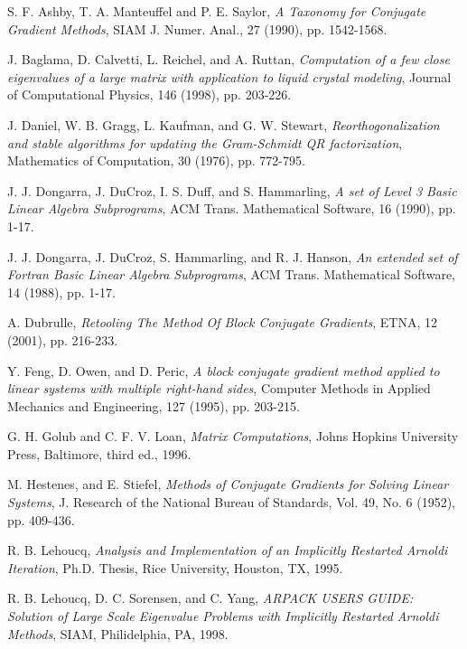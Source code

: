 \documentclass{article}
\begin{document}
\begin{thebibliography}{AAAA99}

 S. F. Ashby, T. A. Manteuffel and P. E.
Saylor, {\em A Taxonomy for Conjugate Gradient Methods}, SIAM J.
Numer. Anal., 27 (1990), pp. 1542-1568.

 J. Baglama, D. Calvetti, L. Reichel, and A.
Ruttan, {\em Computation of a few close eigenvalues of a large
matrix with application to liquid crystal modeling}, Journal of
Computational Physics, 146 (1998), pp. 203-226.

 J. Daniel, W. B. Gragg, L. Kaufman, and G. W.
Stewart, {\em Reorthogonalization and stable algorithms for
updating the Gram-Schmidt QR factorization}, Mathematics of
Computation, 30 (1976), pp. 772-795.

 J. J. Dongarra, J. DuCroz, I. S. Duff, and S.
Hammarling, {\em A set of Level 3 Basic Linear Algebra
Subprograms}, ACM Trans. Mathematical Software, 16 (1990), pp.
1-17.

 J. J. Dongarra, J. DuCroz, S. Hammarling, and
R. J. Hanson, {\em An extended set of Fortran Basic Linear Algebra
Subprograms}, ACM Trans. Mathematical Software, 14 (1988), pp.
1-17.

 A. Dubrulle, {\em Retooling The Method Of
Block Conjugate Gradients}, ETNA, 12 (2001), pp. 216-233.

 Y. Feng, D. Owen, and D. Peric, {\em A
block conjugate gradient method applied to linear systems with
multiple right-hand sides}, Computer Methods in Applied Mechanics
and Engineering, 127 (1995), pp. 203-215.

 G. H. Golub and C. F. V. Loan, {\em Matrix
Computations}, Johns Hopkins University Press, Baltimore, third
ed., 1996.

 M. Hestenes, and E. Stiefel, {\em Methods of
Conjugate Gradients for Solving Linear Systems}, J. Research of
the National Bureau of Standards, Vol. 49, No. 6 (1952), pp.
409-436.

 R. B. Lehoucq, {\em Analysis and Implementation
of an Implicitly Restarted Arnoldi Iteration}, Ph.D. Thesis, Rice
University, Houston, TX, 1995.

 R. B. Lehoucq, D. C. Sorensen, and C. Yang,
{\em ARPACK USERS GUIDE: Solution of Large Scale Eigenvalue
Problems with Implicitly Restarted Arnoldi Methods}, SIAM,
Philidelphia, PA, 1998.


\end{thebibliography}
\end{document}
